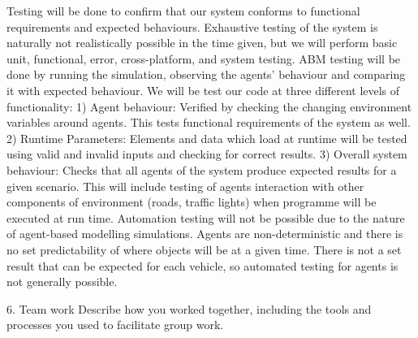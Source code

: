 \documentclass[11pt]{article}
\begin{document}
Testing will be done to confirm that our system conforms to functional requirements and expected behaviours. Exhaustive testing of the system is naturally not realistically possible in the time given, but we will perform basic unit, functional, error, cross-platform, and system testing. 
ABM testing will be done by running the simulation, observing the agents' behaviour and comparing it with expected behaviour. We will be test our code at three diﬀerent levels of functionality:
1)  Agent behaviour: Verified by checking the changing environment variables around agents. This tests functional requirements of the system as well.
2)  Runtime Parameters: Elements and data which load at runtime will be tested using valid and invalid inputs and checking for correct results. 
3)  Overall system behaviour: Checks that all agents of the system produce expected results for a given scenario.
This will include testing of agents interaction with other components of environment (roads, traﬃc lights) when programme will be executed at run time.
Automation testing will not be possible due to the nature of agent-based modelling simulations. Agents are non-deterministic and there is no set predictability of where objects will be at a given time. There is not a set result that can be expected for each vehicle, so automated testing for agents is not generally possible. 

6. Team work Describe how you worked together, including the tools and processes you used to facilitate group work.
\end{document}
